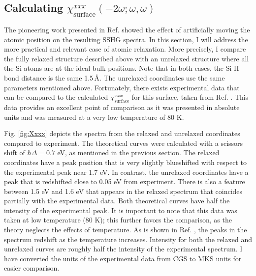 
\subsection{Calculating 
\texorpdfstring{$\chi^{xxx}_{\mathrm{surface}}(-2\omega;\omega,\omega)$}{Xxxx}}
\label{sec:res1x1chi}

The pioneering work presented in Ref. \cite{mejiaPRB02} showed the effect of
artificially moving the atomic position on the resulting SSHG spectra. In this
section, I will address the more practical and relevant case of atomic
relaxation. More precisely, I compare the fully relaxed structure described
above with an unrelaxed structure where all the Si atoms are at the ideal bulk
positions. Note that in both cases, the Si-H bond distance is the same 1.5\,\AA.
The unrelaxed coordinates use the same parameters mentioned above. Fortunately,
there exists experimental data that can be compared to the calculated
$\chi^{xxx}_{\mathrm{surface}}$ for this surface, taken from Ref.
\cite{hoferAPA96}. This data provides an excellent point of comparison as it was
presented in absolute units and was measured at a very low temperature of 80 K.

Fig. \ref{fig:Xxxx} depicts the spectra from the relaxed and unrelaxed
coordinates compared to experiment. The theoretical curves were calculated with
a scissors shift of $\hbar\Delta = 0.7$ eV, as mentioned in the previous
section. The relaxed coordinates have a peak position that is very slightly
blueshifted with respect to the experimental peak near 1.7 eV. In contrast, the
unrelaxed coordinates have a peak that is redshifted close to 0.05 eV from
experiment. There is also a feature between 1.5 eV and 1.6 eV that appears in
the relaxed spectrum that coincides partially with the experimental data. Both
theoretical curves have half the intensity of the experimental peak. It is
important to note that this data was taken at low temperature (80 K); this
further favors the comparison, as the theory neglects the effects of
temperature. As is shown in Ref. \cite{hoferAPA96}, the peaks in the spectrum
redshift as the temperature increases. Intensity for both the relaxed and
unrelaxed curves are roughly half the intensity of the experimental spectrum. I
have converted the units of the experimental data from CGS to MKS units for
easier comparison.

